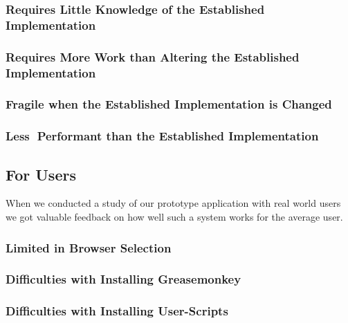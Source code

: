 \subsubsection{Requires Little Knowledge of the Established Implementation}

\subsubsection{Requires More Work than Altering the Established Implementation}

\subsubsection{Fragile when the Established Implementation is Changed}

\subsubsection{Less Performant than the Established Implementation}

\subsection{For Users}

When we conducted a study of our prototype application with real world users
we got valuable feedback on how well such a system works for the average user.


\subsubsection{Limited in Browser Selection}

\subsubsection{Difficulties with Installing Greasemonkey}

\subsubsection{Difficulties with Installing User-Scripts}
